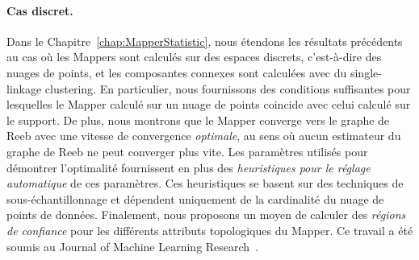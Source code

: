 
\paragraph*{Cas discret.} Dans le Chapitre~\ref{chap:MapperStatistic}, nous \'etendons les r\'esultats pr\'ec\'edents au cas o\`u
les Mappers sont calcul\'es sur des espaces discrets, c'est-\`a-dire des nuages de points, et les composantes connexes sont calcul\'ees avec
du single-linkage clustering. En particulier, nous fournissons des conditions suffisantes pour lesquelles le Mapper calcul\'e sur un nuage de points 
coincide avec celui calcul\'e sur le support. De plus, nous montrons que le Mapper converge vers le graphe de Reeb avec une vitesse de convergence
{\em optimale}, au sens o\`u aucun estimateur du graphe de Reeb ne peut converger plus vite. Les param\`etres utilis\'es pour d\'emontrer l'optimalit\'e
fournissent en plus des {\em heuristiques pour le r\'eglage automatique} de ces param\`etres. Ces heuristiques se basent sur des techniques
de sous-\'echantillonnage et d\'ependent uniquement de la cardinalit\'e du nuage de points de donn\'ees. Finalement, nous proposons
un moyen de calculer des {\em r\'egions de confiance} pour les diff\'erents attributs topologiques du Mapper.
Ce travail a \'et\'e soumis au Journal of Machine Learning Research~\cite{Carriere17c}. 

